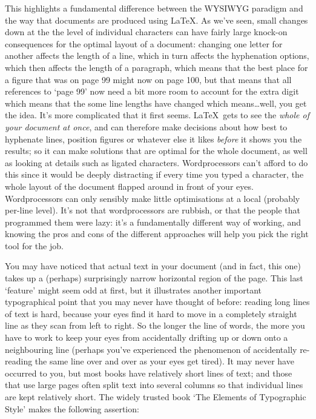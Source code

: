 \begin{refsection}
This highlights a fundamental difference between the WYSIWYG para\-digm and the way that documents are produced using \LaTeX. As we've seen, small changes down at the the level of individual characters can have fairly large knock-on consequences for the optimal layout of a document: changing one letter for another affects the length of a line, which in turn affects the hyphenation options, which then affects the length of a paragraph, which means that the best place for a figure that was on page 99 might now on page 100, but that means that all references to `page 99' now need a bit more room to account for the extra digit which means that the some line lengths have changed which means\ldots well, you get the idea. It's more complicated that it first seems. \LaTeX\ gets to see the \emph{whole of your document at once}, and can therefore make decisions about how best to hyphenate lines,  position figures or whatever else it likes \emph{before} it shows you the results; so it can make solutions that are optimal for the whole document, as well as looking at details such as ligated characters. Wordprocessors can't afford to do this since it would be deeply distracting if every time you typed a character, the whole layout of the document flapped around in front of your eyes. Wordprocessors can only sensibly make little optimisations at a local (probably per-line level). It's not that wordprocessors are rubbish, or that the people that programmed them were lazy: it's a fundamentally different way of working, and knowing the pros and cons of the different approaches will help you pick the right tool for the job. 

You may have noticed that actual text in your document (and in fact, this one) takes up a (perhaps) surprisingly narrow horizontal region of the page. This last `feature' might seem odd at first, but it illustrates another important typographical point that you may never have thought of before: reading long lines of text is hard, because your eyes find it hard to move in a completely straight line as they scan from left to right. So the longer the line of words, the more you have to work to keep your eyes from accidentally drifting up or down onto a neighbouring line (perhaps you've experienced the phenomenon of accidentally re-reading the same line over and over as your eyes get tired). It may never have occurred to you, but most books have relatively short lines of text; and those that use large pages often split text into several columns so that individual lines are kept relatively short. The widely trusted book `The Elements of Typographic Style' \citep{bringhurst92} makes the following assertion:


\end{refsection}
